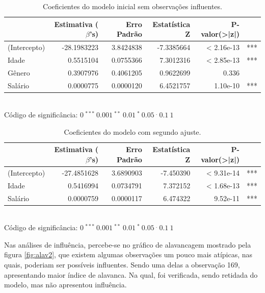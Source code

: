 \documentclass[a4paper]{article}
\begin{document}
\begin{table}[H] 
\caption{Coeficientes do modelo inicial sem observações influentes.}
\begin{center}
\begin{tabular}{lrrrrl}
\hline
  & Estimativa ($\beta$'s) & Erro Padrão & Estatística Z & P-valor(>|z|)\\
\hline
(Intercepto) & -28.1983223 & 3.8424838 & -7.3385664 & < 2.16e-13 & ***\\
Idade & 0.5515104 & 0.0755366 & 7.3012316 & < 2.85e-13 & ***\\
Gênero & 0.3907976 & 0.4061205 & 0.9622699 & 0.336 &\\
Salário & 0.0000775 & 0.0000120 & 6.4521757 & 1.10e-10 & ***\\
\hline
\end{tabular}
\\\tiny{\hspace{-5cm} Código de significância: $0\ ^{***}\ 0.001\ ^{**}\ 0.01\ ^{*}\ 0.05\ ^{.}\ 0.1 \ 1$}
\label{tab5}
\end{center}
\end{table}


\begin{table}[H] 
\caption{Coeficientes do modelo com segundo ajuste.}
\begin{center}
\begin{tabular}{lrrrrl}
\hline
  & Estimativa ($\beta$'s) & Erro Padrão & Estatística Z & P-valor(>|z|)\\
\hline
(Intercepto) & -27.4851628 & 3.6890903 & -7.450390 & < 9.31e-14 & ***\\
Idade & 0.5416994 & 0.0734791 & 7.372152 & < 1.68e-13 & ***\\
Salário & 0.0000759 & 0.0000117 & 6.474322 & 9.52e-11 & ***\\
\hline
\end{tabular}
\\\tiny{\hspace{-5cm} Código de significância: $0\ ^{***}\ 0.001\ ^{**}\ 0.01\ ^{*}\ 0.05\ ^{.}\ 0.1 \ 1$}
\label{tab6}
\end{center}
\end{table}

Nas análises de influência, percebe-se no gráfico de alavancagem mostrado pela figura \ref{fig:alav2}, que existem algumas observações um pouco mais atípicas, nas quais, poderiam ser possíveis influentes. Sendo uma delas a observação 169, apresentando maior índice de alavanca. Na qual, foi verificada, sendo retidada do modelo, mas não apresentou influência.
\end{document}

